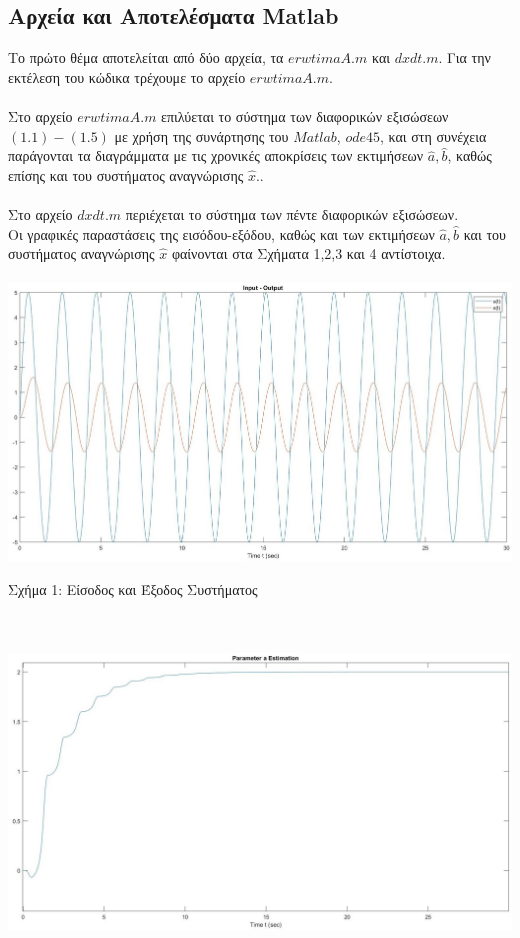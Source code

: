 \documentclass[12pt]{article}
\begin{document}
\subsection{Αρχεία και Αποτελέσματα Matlab}
Το πρώτο θέμα αποτελείται από δύο αρχεία, τα $erwtimaA.m$ και $dxdt.m$. Για την εκτέλεση του  κώδικα τρέχουμε το αρχείο $erwtimaA.m$.
\\ \\
Στο αρχείο $erwtimaA.m$ επιλύεται το σύστημα των διαφορικών εξισώσεων $(1.1)-(1.5)$ με χρήση της συνάρτησης του $Matlab$, $ode45$, και στη συνέχεια παράγονται τα διαγράμματα με τις χρονικές αποκρίσεις των εκτιμήσεων $\hat{a},\hat{b}$, καθώς επίσης και του συστήματος αναγνώρισης $\hat{x}$..
\\ \\
Στο αρχείο $dxdt.m$ περιέχεται το σύστημα των πέντε διαφορικών εξισώσεων.
\\
Οι γραφικές παραστάσεις της εισόδου-εξόδου, καθώς και των εκτιμήσεων $\hat{a},\hat{b}$ και του συστήματος αναγνώρισης $\hat{x}$ φαίνονται στα Σχήματα 1,2,3 και 4 αντίστοιχα.
\\ \\
\includegraphics[width=\linewidth]{inp_out.jpg}
\centerline{Σχήμα 1: Είσοδος και Έξοδος Συστήματος}
\\ \\
\includegraphics[width=\linewidth]{a_estim_1.jpg}
\end{document}
